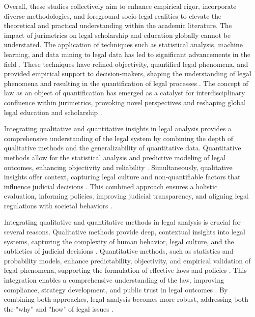 Overall, these studies collectively aim to enhance empirical rigor, incorporate diverse methodologies, and foreground socio-legal realities to elevate the theoretical and practical understanding within the academic literature. The impact of jurimetrics on legal scholarship and education globally cannot be understated. The application of techniques such as statistical analysis, machine learning, and data mining to legal data has led to significant advancements in the field \cite{aafedeccbdaceab,cadcdbdbbdad,faecffafcada,aeadeccffe,ccdacdfbcdaf}. These techniques have refined objectivity, quantified legal phenomena, and provided empirical support to decision-makers, shaping the understanding of legal phenomena and resulting in the quantification of legal processes \cite{ccdacdfbcdaf,efbfffafaacadd}. The concept of law as an object of quantification has emerged as a catalyst for interdisciplinary confluence within jurimetrics, provoking novel perspectives and reshaping global legal education and scholarship \cite{losano2006}.

Integrating qualitative and quantitative insights in legal analysis provides a comprehensive understanding of the legal system by combining the depth of qualitative methods and the generalizability of quantitative data. Quantitative methods allow for the statistical analysis and predictive modeling of legal outcomes, enhancing objectivity and reliability \cite{ribeiro2021, restrepoamariles2015}. Simultaneously, qualitative insights offer context, capturing legal culture and non-quantifiable factors that influence judicial decisions \cite{restrepoamariles2015, nunes2018}. This combined approach ensures a holistic evaluation, informing policies, improving judicial transparency, and aligning legal regulations with societal behaviors \cite{massuanganhe2016, silva2023}.

Integrating qualitative and quantitative methods in legal analysis is crucial for several reasons. Qualitative methods provide deep, contextual insights into legal systems, capturing the complexity of human behavior, legal culture, and the subtleties of judicial decisions \cite{massuanganhe2016, restrepoamariles2015}. Quantitative methods, such as statistics and probability models, enhance predictability, objectivity, and empirical validation of legal phenomena, supporting the formulation of effective laws and policies \cite{zabala2019, massuanganhe2016}. This integration enables a comprehensive understanding of the law, improving compliance, strategy development, and public trust in legal outcomes \cite{nunes2018, ribeiro2021}. By combining both approaches, legal analysis becomes more robust, addressing both the "why" and "how" of legal issues \cite{nunes2018}.

